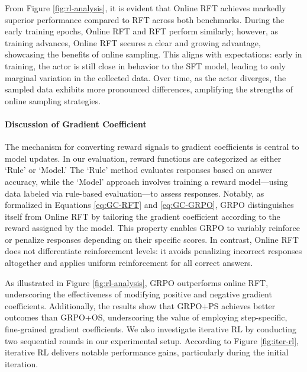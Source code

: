 {From Figure \ref{fig:rl-analysis}, it is evident that Online RFT achieves markedly superior performance compared to RFT across both benchmarks. During the early training epochs, Online RFT and RFT perform similarly; however, as training advances, Online RFT secures a clear and growing advantage, showcasing the benefits of online sampling. This aligns with expectations: early in training, the actor is still close in behavior to the SFT model, leading to only marginal variation in the collected data. Over time, as the actor diverges, the sampled data exhibits more pronounced differences, amplifying the strengths of online sampling strategies.

\paragraph{Discussion of Gradient Coefficient} The mechanism for converting reward signals to gradient coefficients is central to model updates. In our evaluation, reward functions are categorized as either `Rule' or `Model.' The `Rule' method evaluates responses based on answer accuracy, while the `Model' approach involves training a reward model—using data labeled via rule-based evaluation—to assess responses. Notably, as formalized in Equations \ref{eq:GC-RFT} and \ref{eq:GC-GRPO}, GRPO distinguishes itself from Online RFT by tailoring the gradient coefficient according to the reward assigned by the model. This property enables GRPO to variably reinforce or penalize responses depending on their specific scores. In contrast, Online RFT does not differentiate reinforcement levels: it avoids penalizing incorrect responses altogether and applies uniform reinforcement for all correct answers.

As illustrated in Figure \ref{fig:rl-analysis}, GRPO outperforms online RFT, underscoring the effectiveness of modifying positive and negative gradient coefficients. Additionally, the results show that GRPO+PS achieves better outcomes than GRPO+OS, underscoring the value of employing step-specific, fine-grained gradient coefficients. We also investigate iterative RL by conducting two sequential rounds in our experimental setup. According to Figure \ref{fig:iter-rl}, iterative RL delivers notable performance gains, particularly during the initial iteration.

}
